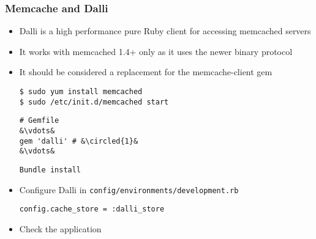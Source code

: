 \documentclass{beamer}
\newcommand*\circled[1]{\tikz[baseline=(char.base)]{
            \node[shape=circle,draw,inner sep=2pt] (char) {#1};}}
\begin{document}
\begin{frame}
\frametitle{Memcache and Dalli}
\begin{itemize}
\item Dalli is a high performance pure Ruby client for accessing memcached servers
\item It works with memcached 1.4+ only as it uses the newer binary protocol
\item It should be considered a replacement for the memcache-client gem

\lstset{language=shell}
\begin{lstlisting}[escapechar=&]
$ sudo yum install memcached
$ sudo /etc/init.d/memcached start
\end{lstlisting}

\lstset{language=Ruby, style=eclipse}
\begin{lstlisting}[escapechar=&]
# Gemfile
&\vdots&
gem 'dalli' # &\circled{1}&
&\vdots&
\end{lstlisting}
\texttt{Bundle install}

\item Configure Dalli in \texttt{config/environments/development.rb}

\lstset{language=Ruby, style=eclipse}
\begin{lstlisting}[escapechar=&]
config.cache_store = :dalli_store
\end{lstlisting}

\item Check the application

\end{itemize}
\end{frame}
\end{document}
